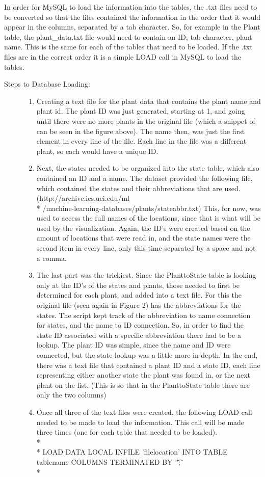 \documentclass{Group6_Phase2}
\begin{document}
In order for MySQL to load the information into the tables, the .txt files need to be converted so that the files contained the information in the order that it would appear in the columns, separated by a tab character. So, for example in the Plant table, the plant\_data.txt file would need to contain an ID, tab character, plant name. This is the same for each of the tables that need to be loaded. If the .txt files are in the correct order it is a simple LOAD call in MySQL to load the tables. 


\begin{description}
	\item[Steps to Database Loading:] \hfill
	\begin{enumerate}
		\item Creating a text file for the plant data that contains the plant name and plant id. The plant ID was just generated, starting at 1, and going until there were no more plants in the original file (which a snippet of can be seen in the figure above). The name then, was just the first element in every line of the file. Each line in the file was a different plant, so each would have a unique ID.
		\item Next, the states needed to be organized into the state table, which also contained an ID and a name. The dataset provided the following file, which contained the states and their abbreviations that are used. (http://archive.ics.uci.edu/ml \\* /machine-learning-databases/plants/stateabbr.txt) This, for now, was used to access the full names of the locations, since that is what will be used by the visualization. Again, the ID's were created based on the amount of locations that were read in, and the state names were the second item in every line, only this time separated by a space and not a comma. 
		\item The last part was the trickiest. Since the PlanttoState table is looking only at the ID's of the states and plants, those needed to first be determined for each plant, and added into a text file. For this the original file (seen again in Figure 2) has the abbreviations for the states. The script kept track of the abbreviation to name connection for states, and the name to ID connection. So, in order to find the state ID associated with a specific abbreviation there had to be a lookup. The plant ID was simple, since the name and ID were connected, but the state lookup was a little more in depth. In the end, there was a text file that contained a plant ID and a state ID, each line representing either another state the plant was found in, or the next plant on the list. (This is so that in the PlanttoState table there are only the two columns)
		\item Once all three of the text files were created, the following LOAD call needed to be made to load the information. This call will be made three times (one for each table that needed to be loaded). \\* \\* LOAD DATA LOCAL INFILE 'filelocation' INTO TABLE tablename COLUMNS TERMINATED BY '\t'; \\*
	\end{enumerate}
\end{description}
\end{document}
